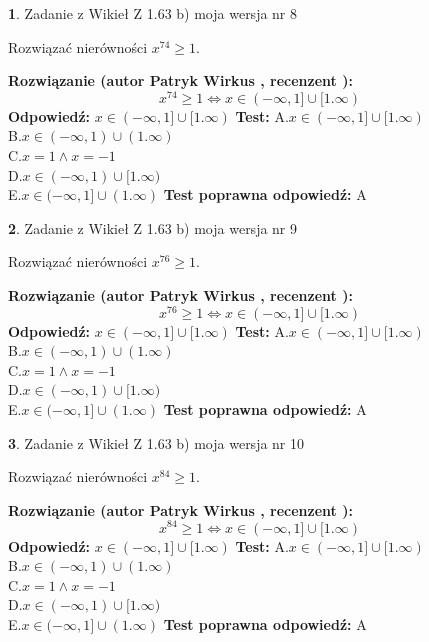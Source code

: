 \documentclass[12pt, a4paper]{article}
\theoremstyle{definition} %
\newtheorem{zad}{}
\newcommand{\zadStart}[1]{\begin{zad}#1\newline}
\newcommand{\zadStop}{\end{zad}}
\newcommand{\rozwStart}[2]{\noindent \textbf{Rozwiązanie (autor #1 , recenzent #2): }\newline}
\newcommand{\rozwStop}{\newline}
\newcommand{\odpStart}{\noindent \textbf{Odpowiedź:}\newline}
\newcommand{\odpStop}{\newline}
\newcommand{\testStart}{\noindent \textbf{Test:}\newline}
\newcommand{\testStop}{\newline}
\newcommand{\kluczStart}{\noindent \textbf{Test poprawna odpowiedź:}\newline}
\newcommand{\kluczStop}{\newline}
\begin{document}
\zadStart{Zadanie z Wikieł Z 1.63 b) moja wersja nr 8}

Rozwiązać nierówności $x^{74} \ge 1$.
\zadStop
\rozwStart{Patryk Wirkus}{}
$$x^{74} \ge 1 \iff x \in (-\infty,1] \cup [1.\infty)$$
\rozwStop
\odpStart
$x \in (-\infty,1] \cup [1.\infty)$
\odpStop
\testStart
A.$x \in (-\infty,1] \cup [1.\infty)$\\ B.$x \in (-\infty,1) \cup (1.\infty)$\\ C.$x = 1 \wedge x = -1$\\ D.$x \in (-\infty,1) \cup [1.\infty)$\\ E.$x \in (-\infty,1] \cup (1.\infty)$
\testStop
\kluczStart
A
\kluczStop



\zadStart{Zadanie z Wikieł Z 1.63 b) moja wersja nr 9}

Rozwiązać nierówności $x^{76} \ge 1$.
\zadStop
\rozwStart{Patryk Wirkus}{}
$$x^{76} \ge 1 \iff x \in (-\infty,1] \cup [1.\infty)$$
\rozwStop
\odpStart
$x \in (-\infty,1] \cup [1.\infty)$
\odpStop
\testStart
A.$x \in (-\infty,1] \cup [1.\infty)$\\ B.$x \in (-\infty,1) \cup (1.\infty)$\\ C.$x = 1 \wedge x = -1$\\ D.$x \in (-\infty,1) \cup [1.\infty)$\\ E.$x \in (-\infty,1] \cup (1.\infty)$
\testStop
\kluczStart
A
\kluczStop



\zadStart{Zadanie z Wikieł Z 1.63 b) moja wersja nr 10}

Rozwiązać nierówności $x^{84} \ge 1$.
\zadStop
\rozwStart{Patryk Wirkus}{}
$$x^{84} \ge 1 \iff x \in (-\infty,1] \cup [1.\infty)$$
\rozwStop
\odpStart
$x \in (-\infty,1] \cup [1.\infty)$
\odpStop
\testStart
A.$x \in (-\infty,1] \cup [1.\infty)$\\ B.$x \in (-\infty,1) \cup (1.\infty)$\\ C.$x = 1 \wedge x = -1$\\ D.$x \in (-\infty,1) \cup [1.\infty)$\\ E.$x \in (-\infty,1] \cup (1.\infty)$
\testStop
\kluczStart
A
\kluczStop
\end{document}
